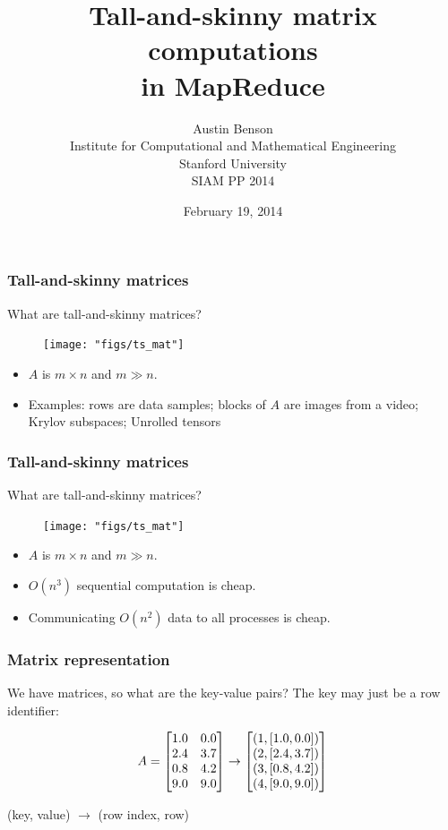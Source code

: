 \documentclass{beamer}
\title{Tall-and-skinny matrix computations \\
 in MapReduce}
\author{
Austin Benson \\
Institute for Computational and Mathematical Engineering \\
Stanford University \\
\vspace{0.2in}
SIAM PP 2014 \\
}
\date{February 19, 2014}
\begin{document}
\maketitle

\begin{frame}
\frametitle{Tall-and-skinny matrices}

What are tall-and-skinny matrices?

\begin{figure}[h!]
\centering
\texttt{[image: "figs/ts\_mat"]}
\end{figure}

\begin{itemize}
\item $A$ is $m \times n$ and $m \gg n$.
\item Examples: rows are data samples; blocks of $A$ are images from a video; Krylov subspaces; Unrolled tensors
\end{itemize}

\end{frame}

\begin{frame}
\frametitle{Tall-and-skinny matrices}

What are tall-and-skinny matrices?

\begin{figure}[h!]
\centering
\texttt{[image: "figs/ts\_mat"]}
\end{figure}

\begin{itemize}
\item $A$ is $m \times n$ and $m \gg n$.
\item $O(n^3)$ sequential computation is cheap.
\item Communicating $O(n^2)$ data to all processes is cheap.
\end{itemize}

\end{frame}


\begin{frame}
\frametitle{Matrix representation}
We have matrices, so what are the key-value pairs?  The key may just be a row identifier:

\vspace{0.2in}

\[
A = \begin{bmatrix} 1.0 & 0.0 \\ 2.4 & 3.7 \\ 0.8 & 4.2 \\ 9.0 & 9.0 \end{bmatrix} \rightarrow \begin{bmatrix}  (1, [1.0, 0.0]) \\  (2, [2.4, 3.7]) \\ (3, [0.8, 4.2]) \\ (4, [9.0, 9.0])  \end{bmatrix}
\]

\vspace{0.3in}
(key, value) $\rightarrow$ (row index, row)

\end{frame}
\end{document}
